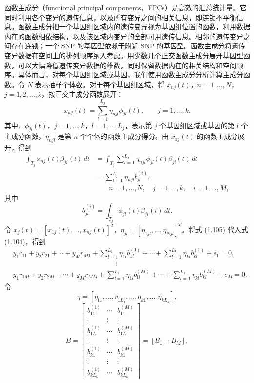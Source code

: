 函数主成分（functional principal components，FPCs）是高效的汇总统计量。它同时利用各个变异的遗传信息，以及所有变异之间的相关信息，即连锁不平衡信息。函数主成分把一个基因组区域内的遗传变异视为基因组位置的函数，利用数据内在的函数相依结构，以及该区域内变异的全部可用遗传信息。相邻的遗传变异之间存在连锁；一个 SNP 的基因型依赖于附近 SNP 的基因型。函数主成分将遗传变异数据在空间上的排列顺序纳入考虑。用少数几个正交函数主成分展开基因型函数，可以大幅降低遗传变异数据的维数，同时保留数据内在的相关结构和空间顺序。具体而言，对每个基因组区域或基因，我们使用函数主成分分析计算主成分函数。令 $N$ 表示抽样个体数。对于每个基因组区域，将 $x_{nj}(t)$，$n=1,\ldots,N$，$j=1,2,\ldots,k$，按正交主成分函数展开：
\[
x_{nj}(t)=\sum_{l=1}^{L_j}\eta_{njl}\phi_{jl}(t),
\qquad j=1,\ldots,k.
\]
其中，$\phi_{jl}(t)$，$j=1,\ldots,k$，$l=1,\ldots,L_j$，表示第 $j$ 个基因组区域或基因的第 $l$ 个主成分函数，$\eta_{njl}$ 是第 $n$ 个个体的函数主成分得分。由 $x_{nj}(t)$ 的函数主成分展开，得到
\begin{equation}
\begin{aligned}
\int_{T_j}x_{nj}(t)\beta_{ji}(t)\,dt
&=\int_{T_j}\sum_{l=1}^{L_j}\eta_{njl}\phi_{jl}(t)\beta_{ji}(t)\,dt\\
&=\sum_{l=1}^{L_j}\eta_{njl}b_{jl}^{(i)},\\[-2pt]
&\qquad n=1,\ldots,N,\quad j=1,\ldots,k,\quad i=1,\ldots,M,
\end{aligned}
\tag{1.105}
\end{equation}
其中
\[
b_{jl}^{(i)}=\int_{T_j}\phi_{jl}(t)\beta_{ji}(t)\,dt.
\]
令 $x_j(t)=[x_{1j}(t),\ldots,x_{nj}(t)]^T$，$\eta_{jl}=[\eta_{1jl},\ldots,\eta_{Njl}]^T$。将式 (1.105) 代入式 (1.104)，得到
\begin{equation}
\begin{aligned}
&y_1r_{11}+y_2r_{21}+\cdots+y_Mr_{M1}
 +\sum_{l=1}^{L_1}\eta_{1l}b_{1l}^{(1)}
 +\cdots+\sum_{l=1}^{L_k}\eta_{kl}b_{kl}^{(1)}+e_1=0,\\
&\hspace{15em}\vdots\\
&y_1r_{1M}+y_2r_{2M}+\cdots+y_Mr_{MM}
 +\sum_{l=1}^{L_1}\eta_{1l}b_{1l}^{(M)}
 +\cdots+\sum_{l=1}^{L_k}\eta_{kl}b_{kl}^{(M)}+e_M=0.
\end{aligned}
\tag{1.106}
\end{equation}
令
\[
\eta=[\eta_{11},\ldots,\eta_{1L_1},\ldots,\eta_{k1},\ldots,\eta_{kL_k}],
\]
\[
B=
\begin{bmatrix}
b_{11}^{(1)}&\cdots&b_{11}^{(M)}\\
\vdots&\vdots&\vdots\\
b_{1L_1}^{(1)}&\cdots&b_{1L_1}^{(M)}\\
\vdots&\vdots&\vdots\\
b_{k1}^{(1)}&\cdots&b_{k1}^{(M)}\\
\vdots&\vdots&\vdots\\
b_{kL_k}^{(1)}&\cdots&b_{kL_k}^{(M)}
\end{bmatrix}
=[B_1\ \cdots\ B_M],
\]
